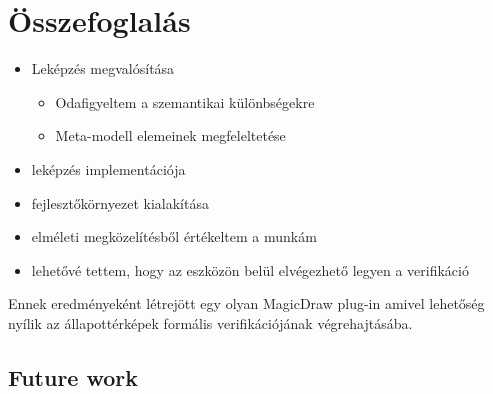 \chapter{Összefoglalás}



\begin{itemize}
	\item Leképzés megvalósítása
	\begin{itemize}
		\item Odafigyeltem a szemantikai különbségekre
		\item Meta-modell elemeinek megfeleltetése
	\end{itemize}
	\item leképzés implementációja
	\item fejlesztőkörnyezet kialakítása
	\item elméleti megközelítésből értékeltem a munkám
	\item lehetővé tettem, hogy az eszközön belül elvégezhető legyen a verifikáció
\end{itemize}

Ennek eredményeként létrejött egy olyan MagicDraw plug-in amivel lehetőség nyílik az állapottérképek formális verifikációjának végrehajtásába.

\section{Future work}


